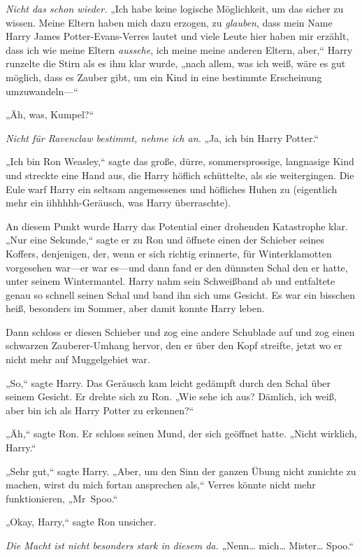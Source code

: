 {\emph{Nicht das schon wieder.} „Ich habe keine logische Möglichkeit, um das sicher zu wissen. Meine Eltern haben mich dazu erzogen, zu \emph{glauben}, dass mein Name Harry James Potter-Evans-Verres lautet und viele Leute hier haben mir erzählt, dass ich wie meine Eltern \emph{aussehe}, ich meine meine anderen Eltern, aber,“ Harry runzelte die Stirn als es ihm klar wurde, „nach allem, was ich weiß, wäre es gut möglich, dass es Zauber gibt, um ein Kind in eine bestimmte Erscheinung umzuwandeln—“

„Äh, was, Kumpel?“

\emph{Nicht für Ravenclaw bestimmt, nehme ich an.} „Ja, ich bin Harry Potter.“

„Ich bin Ron Weasley,“ sagte das große, dürre, sommersprossige, langnasige Kind und streckte eine Hand aus, die Harry höflich schüttelte, als sie weitergingen. Die Eule warf Harry ein seltsam angemessenes und höfliches Huhen zu (eigentlich mehr ein iihhhhh-Geräusch, was Harry überraschte).

An diesem Punkt wurde Harry das Potential einer drohenden Katastrophe klar. „Nur eine Sekunde,“ sagte er zu Ron und öffnete einen der Schieber seines Koffers, denjenigen, der, wenn er sich richtig erinnerte, für Winterklamotten vorgesehen war—er war es—und dann fand er den dünnsten Schal den er hatte, unter seinem Wintermantel. Harry nahm sein Schweißband ab und entfaltete genau so schnell seinen Schal und band ihn sich ums Gesicht. Es war ein bisschen heiß, besonders im Sommer, aber damit konnte Harry leben.

Dann schloss er diesen Schieber und zog eine andere Schublade auf und zog einen schwarzen Zauberer-Umhang hervor, den er über den Kopf streifte, jetzt wo er nicht mehr auf Muggelgebiet war.

„So,“ sagte Harry. Das Geräusch kam leicht gedämpft durch den Schal über seinem Gesicht. Er drehte sich zu Ron. „Wie sehe ich aus? Dämlich, ich weiß, aber bin ich als Harry Potter zu erkennen?“

„Äh,“ sagte Ron. Er schloss seinen Mund, der sich geöffnet hatte. „Nicht wirklich, Harry.“

„Sehr gut,“ sagte Harry. „Aber, um den Sinn der ganzen Übung nicht zunichte zu machen, wirst du mich fortan ansprechen als,“ Verres könnte nicht mehr funktionieren, „Mr~Spoo.“

„Okay, Harry,“ sagte Ron unsicher.

\emph{Die Macht ist nicht besonders stark in diesem da.} „Nenn… mich… Mister… Spoo.“

}

